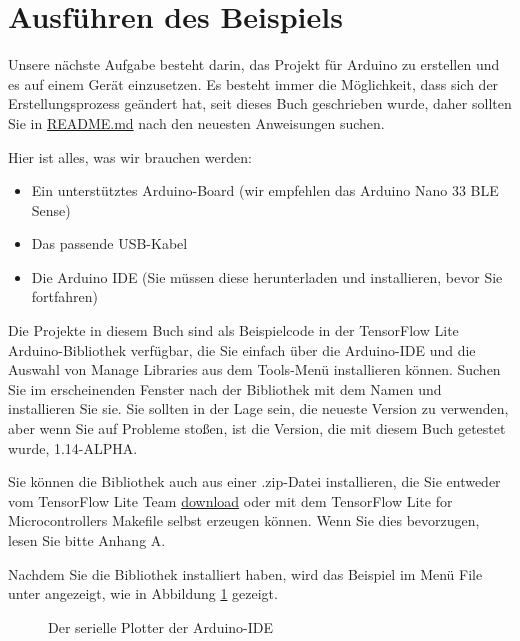      
\section{Ausführen des Beispiels}
     
Unsere nächste Aufgabe besteht darin, das Projekt für Arduino zu erstellen und es auf einem Gerät einzusetzen. 	Es besteht immer die Möglichkeit, dass sich der Erstellungsprozess geändert hat, seit dieses Buch geschrieben wurde, daher sollten Sie in \href{https://oreil.ly/s2mj1}{README.md} nach den neuesten Anweisungen suchen.
     
Hier ist alles, was wir brauchen werden:

\begin{itemize}
    \item Ein unterstütztes Arduino-Board (wir empfehlen das Arduino Nano 33 BLE Sense)
    \item Das passende USB-Kabel 
    \item Die Arduino IDE (Sie müssen diese herunterladen und installieren, bevor Sie fortfahren)
\end{itemize}
     
 Die Projekte in diesem Buch sind als Beispielcode in der TensorFlow Lite Arduino-Bibliothek verfügbar, die Sie einfach über die Arduino-IDE und die Auswahl von Manage Libraries aus dem Tools-Menü installieren können. Suchen Sie im erscheinenden Fenster nach der Bibliothek mit dem Namen  und installieren Sie sie. Sie sollten in der Lage sein, die neueste Version zu verwenden, aber wenn Sie auf Probleme stoßen, ist die Version, die mit diesem Buch getestet wurde, 1.14-ALPHA.
     
Sie können die Bibliothek auch aus einer .zip-Datei installieren, die Sie entweder vom TensorFlow Lite Team \href{https://oreil.ly/blgB8}{download} oder mit dem TensorFlow Lite for Microcontrollers Makefile selbst erzeugen können. Wenn Sie dies bevorzugen, lesen Sie bitte Anhang A.

Nachdem Sie die Bibliothek installiert haben, wird das Beispiel im Menü File unter  angezeigt, wie in Abbildung \ref{fig:ArduIDE} gezeigt.	

\begin{figure}
    \centering
    
    \caption{Der serielle Plotter der Arduino-IDE}\label{fig:ArduIDE}
\end{figure}
 	
